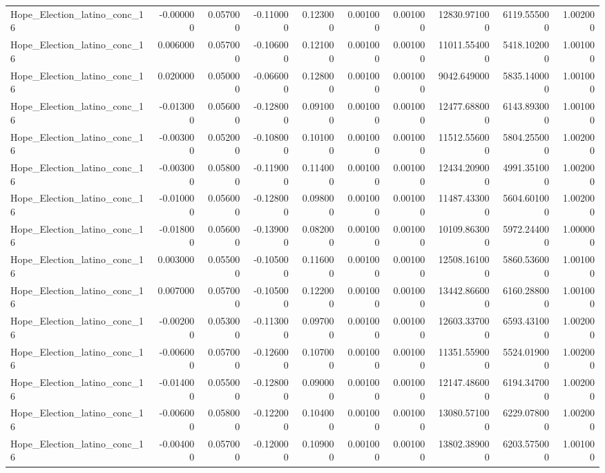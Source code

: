 \begin{table}
\begin{tabular}{lrrrrrrrrr}
Hope_Election_latino_conc_16 & -0.000000 & 0.057000 & -0.110000 & 0.123000 & 0.001000 & 0.001000 & 12830.971000 & 6119.555000 & 1.002000 \\
Hope_Election_latino_conc_16 & 0.006000 & 0.057000 & -0.106000 & 0.121000 & 0.001000 & 0.001000 & 11011.554000 & 5418.102000 & 1.001000 \\
Hope_Election_latino_conc_16 & 0.020000 & 0.050000 & -0.066000 & 0.128000 & 0.001000 & 0.001000 & 9042.649000 & 5835.140000 & 1.001000 \\
Hope_Election_latino_conc_16 & -0.013000 & 0.056000 & -0.128000 & 0.091000 & 0.001000 & 0.001000 & 12477.688000 & 6143.893000 & 1.001000 \\
Hope_Election_latino_conc_16 & -0.003000 & 0.052000 & -0.108000 & 0.101000 & 0.001000 & 0.001000 & 11512.556000 & 5804.255000 & 1.002000 \\
Hope_Election_latino_conc_16 & -0.003000 & 0.058000 & -0.119000 & 0.114000 & 0.001000 & 0.001000 & 12434.209000 & 4991.351000 & 1.002000 \\
Hope_Election_latino_conc_16 & -0.010000 & 0.056000 & -0.128000 & 0.098000 & 0.001000 & 0.001000 & 11487.433000 & 5604.601000 & 1.002000 \\
Hope_Election_latino_conc_16 & -0.018000 & 0.056000 & -0.139000 & 0.082000 & 0.001000 & 0.001000 & 10109.863000 & 5972.244000 & 1.000000 \\
Hope_Election_latino_conc_16 & 0.003000 & 0.055000 & -0.105000 & 0.116000 & 0.001000 & 0.001000 & 12508.161000 & 5860.536000 & 1.001000 \\
Hope_Election_latino_conc_16 & 0.007000 & 0.057000 & -0.105000 & 0.122000 & 0.001000 & 0.001000 & 13442.866000 & 6160.288000 & 1.001000 \\
Hope_Election_latino_conc_16 & -0.002000 & 0.053000 & -0.113000 & 0.097000 & 0.001000 & 0.001000 & 12603.337000 & 6593.431000 & 1.002000 \\
Hope_Election_latino_conc_16 & -0.006000 & 0.057000 & -0.126000 & 0.107000 & 0.001000 & 0.001000 & 11351.559000 & 5524.019000 & 1.002000 \\
Hope_Election_latino_conc_16 & -0.014000 & 0.055000 & -0.128000 & 0.090000 & 0.001000 & 0.001000 & 12147.486000 & 6194.347000 & 1.002000 \\
Hope_Election_latino_conc_16 & -0.006000 & 0.058000 & -0.122000 & 0.104000 & 0.001000 & 0.001000 & 13080.571000 & 6229.078000 & 1.002000 \\
Hope_Election_latino_conc_16 & -0.004000 & 0.057000 & -0.120000 & 0.109000 & 0.001000 & 0.001000 & 13802.389000 & 6203.575000 & 1.001000 \\

\end{tabular}
\end{table}
